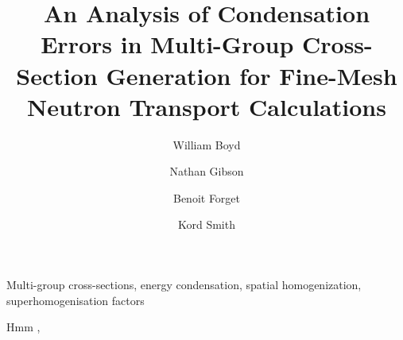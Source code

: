 \documentclass[authoryear,5p]{elsarticle}
\begin{document}
\begin{frontmatter}

\title{An Analysis of Condensation Errors in Multi-Group Cross-Section Generation for Fine-Mesh Neutron Transport Calculations}

\author{William Boyd}

\author{Nathan Gibson\corref{}}

\author{Benoit Forget\corref{}}

\author{Kord Smith\corref{}}

\address{Massachusetts Institute of Technology, Department of Nuclear Science and Engineering, 77 Massachusetts Avenue, Building 24, Cambridge, MA 02139, United States\vspace{-8ex}}


\begin{abstract}

\end{abstract}

\begin{keyword}
Multi-group cross-sections, energy condensation, spatial homogenization, superhomogenisation factors
\end{keyword}

\end{frontmatter}

%

Hmm \cite{askew1972moc} \cite{hebert2005ribon}, \cite{hebert1993consistent} \cite{hebert1997advances}
\end{document}
